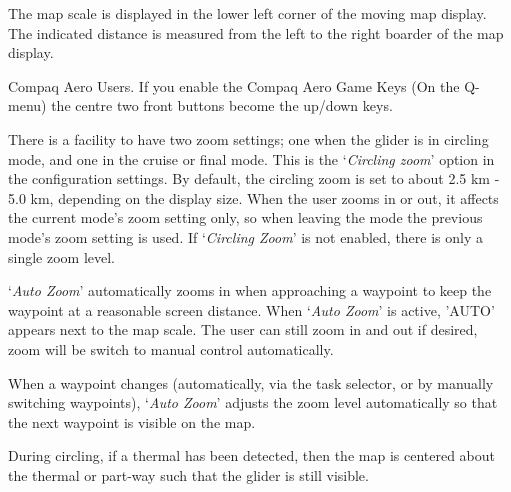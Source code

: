 The map scale is displayed in the lower left corner of the moving map
display. The indicated distance is measured from the left to the right boarder
of the map display.

Compaq Aero Users. If you enable the Compaq Aero Game Keys (On the
Q-menu) the centre two front buttons become the up/down keys.

There is a facility to have two zoom settings; one when the glider is
in circling mode, and one in the cruise or final mode.  This is the `{\it Circling zoom}' 
option in the  configuration settings.  
By default, the circling zoom is set to about 2.5 km - 5.0 km, depending on the
display size. When the user zooms in or out, it affects the current
mode's zoom setting only, so when leaving the mode the previous mode's
zoom setting is used.  If `{\it Circling Zoom}' is not enabled,
there is only a single zoom level.

`{\it Auto Zoom}' automatically zooms in when approaching a waypoint to keep
the waypoint at a reasonable screen distance. When `{\it Auto Zoom}' is active,
'AUTO' appears next to the map scale. The user can still zoom
in and out if desired, zoom will be switch to manual control automatically.

When a waypoint changes (automatically, via the task selector, or by
manually switching waypoints), `{\it Auto Zoom}' adjusts the zoom level
automatically so that the next waypoint is visible on the map.

During circling, if a thermal has been detected, then the map is centered about
the thermal or part-way such that the glider is still visible.

